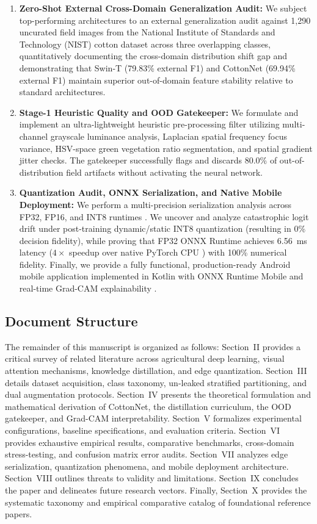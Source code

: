 \documentclass[journal,10pt,twocolumn]{IEEEtran}
\begin{document}
\begin{enumerate}[leftmargin=*]
    \item \textbf{Zero-Shot External Cross-Domain Generalization Audit:} We subject top-performing architectures to an external generalization audit against 1,290 uncurated field images from the National Institute of Standards and Technology (NIST) cotton dataset across three overlapping classes, quantitatively documenting the cross-domain distribution shift gap and demonstrating that Swin-T (79.83\% external F1) and CottonNet (69.94\% external F1) maintain superior out-of-domain feature stability relative to standard architectures.
    \item \textbf{Stage-1 Heuristic Quality and OOD Gatekeeper:} We formulate and implement an ultra-lightweight heuristic pre-processing filter utilizing multi-channel grayscale luminance analysis, Laplacian spatial frequency focus variance, HSV-space green vegetation ratio segmentation, and spatial gradient jitter checks. The gatekeeper successfully flags and discards 80.0\% of out-of-distribution field artifacts without activating the neural network.
    \item \textbf{Quantization Audit, ONNX Serialization, and Native Mobile Deployment:} We perform a multi-precision serialization analysis across FP32, FP16, and INT8 runtimes \cite{jacob2018quantization, onnx2019}. We uncover and analyze catastrophic logit drift under post-training dynamic/static INT8 quantization (resulting in 0\% decision fidelity), while proving that FP32 ONNX Runtime achieves 6.56~ms latency ($4\times$ speedup over native PyTorch CPU \cite{paszke2019pytorch}) with 100\% numerical fidelity. Finally, we provide a fully functional, production-ready Android mobile application implemented in Kotlin with ONNX Runtime Mobile and real-time Grad-CAM explainability \cite{selvaraju2017grad}.
\end{enumerate}

\subsection{Document Structure}
The remainder of this manuscript is organized as follows: Section~II provides a critical survey of related literature across agricultural deep learning, visual attention mechanisms, knowledge distillation, and edge quantization. Section~III details dataset acquisition, class taxonomy, un-leaked stratified partitioning, and dual augmentation protocols. Section~IV presents the theoretical formulation and mathematical derivation of CottonNet, the distillation curriculum, the OOD gatekeeper, and Grad-CAM interpretability. Section~V formalizes experimental configurations, baseline specifications, and evaluation criteria. Section~VI provides exhaustive empirical results, comparative benchmarks, cross-domain stress-testing, and confusion matrix error audits. Section~VII analyzes edge serialization, quantization phenomena, and mobile deployment architecture. Section~VIII outlines threats to validity and limitations. Section~IX concludes the paper and delineates future research vectors. Finally, Section~X provides the systematic taxonomy and empirical comparative catalog of foundational reference papers.
\end{document}
